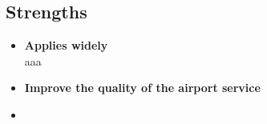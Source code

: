 \documentclass{mcmthesis}
\begin{document}
\subsection{Strengths}
\begin{itemize}
\item \textbf{Applies widely}\\
aaa \cite{auto}
\item \textbf{Improve the quality of the airport service}\\

\item \textbf{}\\
\end{itemize}


\begin{appendices}



\end{appendices}
\nocite{*}



	
\end{document}
